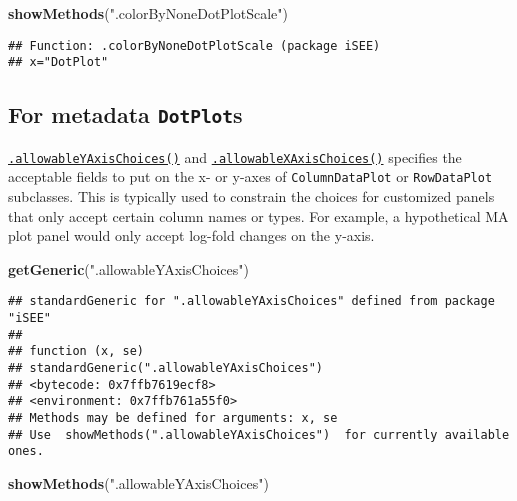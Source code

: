 \documentclass[
]{book}
\newenvironment{Shaded}{\begin{snugshade}}{\end{snugshade}}
\newcommand{\KeywordTok}[1]{\textcolor[rgb]{0.13,0.29,0.53}{\textbf{#1}}}
\newcommand{\NormalTok}[1]{#1}
\newcommand{\StringTok}[1]{\textcolor[rgb]{0.31,0.60,0.02}{#1}}
\begin{document}
\begin{Shaded}
\begin{Highlighting}[]
\KeywordTok{showMethods}\NormalTok{(}\StringTok{".colorByNoneDotPlotScale"}\NormalTok{)}
\end{Highlighting}
\end{Shaded}

\begin{verbatim}
## Function: .colorByNoneDotPlotScale (package iSEE)
## x="DotPlot"
\end{verbatim}

\hypertarget{for-metadata-dotplots}{%
\subsection{\texorpdfstring{For metadata \texttt{DotPlot}s}{For metadata DotPlots}}\label{for-metadata-dotplots}}

\href{https://isee.github.io/iSEE/reference/metadata-plot-generics.html}{\texttt{.allowableYAxisChoices()}} and \href{https://isee.github.io/iSEE/reference/metadata-plot-generics.html}{\texttt{.allowableXAxisChoices()}} specifies the acceptable fields to put on the x- or y-axes of \texttt{ColumnDataPlot} or \texttt{RowDataPlot} subclasses.
This is typically used to constrain the choices for customized panels that only accept certain column names or types.
For example, a hypothetical MA plot panel would only accept log-fold changes on the y-axis.

\begin{Shaded}
\begin{Highlighting}[]
\KeywordTok{getGeneric}\NormalTok{(}\StringTok{".allowableYAxisChoices"}\NormalTok{)}
\end{Highlighting}
\end{Shaded}

\begin{verbatim}
## standardGeneric for ".allowableYAxisChoices" defined from package "iSEE"
## 
## function (x, se) 
## standardGeneric(".allowableYAxisChoices")
## <bytecode: 0x7ffb7619ecf8>
## <environment: 0x7ffb761a55f0>
## Methods may be defined for arguments: x, se
## Use  showMethods(".allowableYAxisChoices")  for currently available ones.
\end{verbatim}

\begin{Shaded}
\begin{Highlighting}[]
\KeywordTok{showMethods}\NormalTok{(}\StringTok{".allowableYAxisChoices"}\NormalTok{)}
\end{Highlighting}
\end{Shaded}
\end{document}
